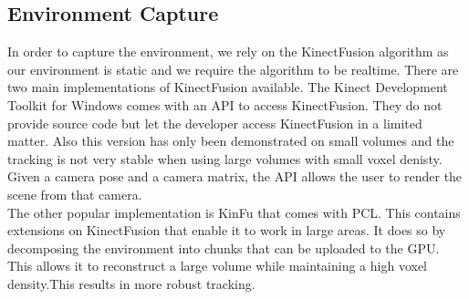 \subsection{Environment Capture}
In order to capture the environment, we rely on the KinectFusion\cite{newcombe2011kinectfusion}  algorithm as our environment is static and we require the algorithm to be realtime. There are two main implementations of KinectFusion available. The Kinect Development Toolkit for Windows comes with an API to access KinectFusion. They do not provide source code but let the developer access KinectFusion in a limited matter. Also this version has only been demonstrated on small volumes and the tracking is not very stable when using large volumes with small voxel denisty. Given a camera pose and a camera matrix, the API allows the user to render the scene from that camera.\\
The other popular implementation is KinFu that comes with PCL. This contains extensions on KinectFusion that enable it to work in large areas. It does so by decomposing the environment into chunks that can be uploaded to the GPU. This allows it to reconstruct a large volume while maintaining a high voxel density.This results in more robust tracking.  